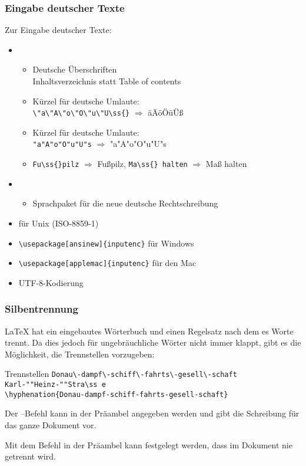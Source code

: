 \begin{frame}[c,fragile]
\frametitle{Eingabe deutscher Texte}

Zur Eingabe deutscher Texte:
\begin{itemize}
\item {}
  \begin{itemize}
  \item Deutsche Überschriften \\ \glqq Inhaltsverzeichnis\grqq{} statt \glqq Table of contents\grqq
  \item K\"urzel f\"ur deutsche Umlaute: \\ \verb+\"a\"A\"o\"O\"u\"U\ss{}+ $\Longrightarrow$ \"a\"A\"o\"O\"u\"U\ss{}
  \item K\"urzel f\"ur deutsche Umlaute: \\ \verb+"a"A"o"O"u"U"s+ $\Longrightarrow$ "a"A"o"O"u"U"s
  \item \verb+Fu\ss{}pilz+ $\Longrightarrow$ Fu\ss{}pilz, \verb+Ma\ss{} halten+ $\Longrightarrow$ Ma\ss{} halten
  \end{itemize}
\item {}
  \begin{itemize}
  \item Sprachpaket f\"ur die neue deutsche Rechtschreibung
  \end{itemize}
\item {} f\"ur Unix (ISO-8859-1)
\item \verb|\usepackage[ansinew]{inputenc}| für Windows
\item \verb|\usepackage[applemac]{inputenc}| für den Mac
\item {} UTF-8-Kodierung
\end{itemize}

\end{frame}

\begin{frame}[c,fragile]
\frametitle{Silbentrennung}

\LaTeX{} hat ein eingebautes W\"orterbuch und einen Regelsatz nach dem es Worte trennt. Da dies jedoch f\"ur ungebr\"auchliche
W\"orter nicht immer klappt, gibt es die M\"oglichkeit, die Trennstellen vorzugeben:

\begin{block}{Trennstellen}
\verb|Donau\-dampf\-schiff\-fahrts\-gesell\-schaft| \\
\verb|Karl-""Heinz-""Stra\ss e| \\
\verb|\hyphenation{Donau-dampf-schiff-fahrts-gesell-schaft}|
\end{block}

Der --Befehl kann in der Pr\"aambel angegeben werden und gibt die Schreibung f\"ur das ganze Dokument vor.

Mit dem Befehl  in der Pr\"aambel kann festgelegt werden, dass im Dokument nie getrennt wird.


\end{frame}

